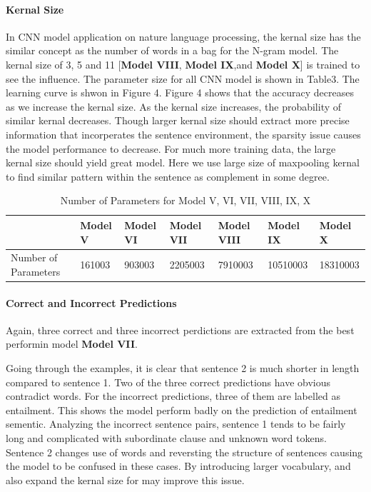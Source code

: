 \documentclass[10pt]{article}
\begin{document}
\paragraph{Kernal Size}
In CNN model application on nature language processing, the kernal size has the similar concept as the number of words in a bag for the N-gram model. The kernal size of 3, 5 and 11 [\textbf{Model VIII}, \textbf{Model IX},and  \textbf{Model X}] is trained to see the influence. The parameter size for all CNN model is shown in Table3. The learning curve is shwon in Figure 4. Figure 4 shows that the accuracy decreases as we increase the kernal size. As the kernal size increases, the probability of similar kernal decreases. Though larger kernal size should extract more precise information that incorperates the sentence environment, the sparsity issue causes the model performance to decrease. For much more training data, the large kernal size should yield great model.  Here we use large size of maxpooling kernal to find similar pattern within the sentence as complement in some degree.
\begin{table}[]
\centering
\caption{Number of Parameters for Model V, VI, VII, VIII, IX, X}
\label{my-label}
\begin{tabular}{lllllll}
\hline
                     & Model V & Model VI & Model VII & Model VIII & Model IX & Model X  \\ \hline
Number of Parameters & 161003  & 903003   & 2205003   & 7910003    & 10510003 & 18310003 \\ \hline
\end{tabular}
\end{table}
\paragraph{Correct and Incorrect Predictions}
Again, three correct and three incorrect perdictions are extracted from the best performin model  \textbf{Model VII}.\par
Going through the examples, it is clear that sentence 2 is much shorter in length compared to sentence 1. Two of the three correct predictions have obvious contradict words. For the incorrect predictions, three of them are labelled as entailment. This shows the model perform badly on the prediction of entailment sementic. Analyzing the incorrect sentence pairs, sentence 1 tends to be fairly long and complicated with subordinate clause and unknown word tokens. Sentence 2 changes use of words and reversting the structure of sentences causing the model to be confused in these cases.  By introducing larger vocabulary, and also expand the kernal size for may improve this issue.
\end{document}
